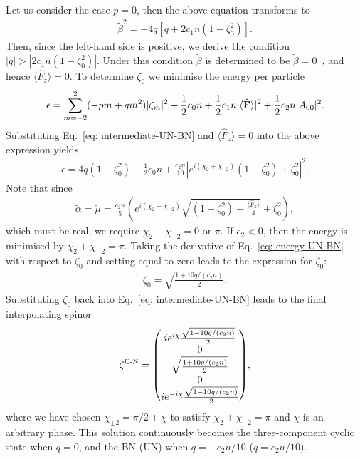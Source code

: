 Let us consider the case \(p=0\), then the above equation transforms to
\begin{align}
    \tilde{\beta}^2 = -4q\left[q + 2c_1n(1-\zeta_0^2)\right].
\end{align}
Then, since the left-hand side is positive, we derive the condition
\(|q| > |2c_1n(1-\zeta_0^2)|\).
Under this condition \(\tilde{\beta}\) is determined to be
\(\tilde{\beta}=0\)~\cite{Kawaguchi2012}, and hence \(\langle\hat{F}_z\rangle
=0\).
To determine \(\zeta_0\) we minimise the energy per
particle~\cite{Kawaguchi2012}
\begin{align}
    \epsilon = \sum_{m=-2}^{2}(-pm+qm^2)|\zeta_m|^2 + \frac{1}{2}c_0n
    + \frac{1}{2}c_1n|\langle \hat{\vb{F}} \rangle |^2 + \frac{1}{2}c_2n|A_{00}|^2.
\end{align}
Substituting Eq.~\eqref{eq: intermediate-UN-BN} and
\(\langle\hat{F}_z\rangle=0\) into the above expression yields
\begin{align}\label{eq: energy-UN-BN}
    \epsilon = 4q(1-\zeta_0^2) + \frac{1}{2}c_0n + \frac{c_2n}{10}\left|
        e^{i(\chi_2+\chi_{-2})}(1-\zeta_0^2) + \zeta_0^2
    \right|^2.
\end{align}
Note that since
\begin{align}
    \tilde{\alpha}=\tilde{\mu}=\frac{c_2n}{5}\left(
        e^{i(\chi_2+\chi_{-2})}\sqrt{(1-\zeta_0^2)
        -\frac{\langle\hat{F}_z\rangle}{4}}
        + \zeta_0^2\right),
\end{align}
which must be real, we require \(\chi_2 + \chi_{-2} = 0\) or \(\pi\).
If \(c_2 < 0\), then the energy is minimised by \(\chi_2+\chi_{-2}=\pi\).
Taking the derivative of Eq.~\eqref{eq: energy-UN-BN} with respect to
\(\zeta_0\) and setting equal to zero leads to the expression for \(\zeta_0\):
\begin{align}
    \zeta_0 = \sqrt{\frac{1 + 10q/(c_2n)}{2}}.    
\end{align}
Substituting \(\zeta_0\) back into Eq.~\eqref{eq: intermediate-UN-BN} leads to
the final interpolating spinor
\begin{align}
    \zeta^\text{C-N} = \mqty(
        ie^{i\chi}\frac{\sqrt{1 - 10q/(c_2n)}}{2} \\
        0 \\
        \sqrt{\frac{1 + 10q/(c_2n)}{2}} \\
        0 \\
        ie^{-i\chi}\frac{\sqrt{1 - 10q/(c_2n)}}{2}
    ),
\end{align}
where we have chosen \(\chi_{\pm 2} = \pi/2 + \chi\) to satisfy
\(\chi_2+\chi_{-2} = \pi\) and \(\chi\) is an arbitrary phase.
This solution continuously becomes the three-component cyclic state when
\(q = 0\), and the BN (UN) when \(q = -c_2n/10\) (\(q = c_2n/10\)).

